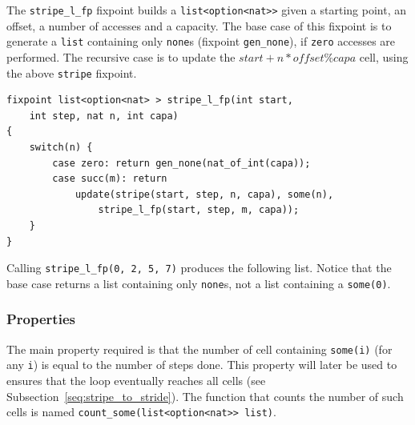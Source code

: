 \documentclass[oneside]{article}
\begin{document}
The \texttt{stripe\_l\_fp} fixpoint builds a \texttt{list<option<nat>>} given a starting point, an offset, a number of accesses and a capacity. The base case of this fixpoint is to generate a \texttt{list} containing only \texttt{none}s (fixpoint \texttt{gen\_none}), if \texttt{zero} accesses are performed. The recursive case is to update the $start + n*offset \%capa$ cell, using the above \texttt{stripe} fixpoint.

\begin{definition}
	\begin{lstlisting}
fixpoint list<option<nat> > stripe_l_fp(int start,
	int step, nat n, int capa)
{
	switch(n) {
		case zero: return gen_none(nat_of_int(capa));
		case succ(m): return 
			update(stripe(start, step, n, capa), some(n), 
				stripe_l_fp(start, step, m, capa));
	}
}
 	\end{lstlisting}
\end{definition}

\begin{example}
	Calling \texttt{stripe\_l\_fp(0, 2, 5, 7)} produces the following list. Notice that the base case returns a list containing only \texttt{none}s, not a list containing a \texttt{some(0)}. 
	\begin{center}
	\end{center}
\end{example}


\subsubsection{Properties}
The main property required is that the number of cell containing \texttt{some(i)} (for any \texttt{i}) is equal to the number of steps done. This property will later be used to ensures that the loop eventually reaches all cells (see Subsection~\ref{seq:stripe_to_stride}). The function that counts the number of such cells is named \texttt{count\_some(list<option<nat>> list)}.
\end{document}
